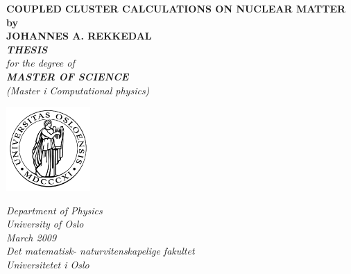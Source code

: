 \thispagestyle{empty}
\begin{center}        %
  \vspace{5mm}          %
  \LARGE
  \textbf{COUPLED CLUSTER CALCULATIONS ON NUCLEAR MATTER} \\
  \Large
  \vspace{5mm}
  \textbf{by} \\
  \vspace{5mm}
  \large
  \textbf{JOHANNES A. REKKEDAL} \\
  \vspace{20mm} 
  \Large
  {\bf{\textsl{THESIS}}} \\
  \textsl{for the degree of} \\
  \vspace{2mm}
  {\bf{\textsl{MASTER OF SCIENCE}}} \\
  \vspace{5mm}
  {\large \textsl {(Master i Computational physics)}}\\
  \vspace{10mm}
  \centerline{
\includegraphics[width=32mm,height=32mm]{uiologo}}
  \vspace{5mm}
  \index{\footnote{}}%
  \textsl{Department of Physics} \\
  \textsl{University of Oslo} \\
  \vspace{10mm}
  \large
  \textsl{March 2009} \\
  \vspace{5mm}
  \normalsize
  \textsl{Det matematisk- naturvitenskapelige fakultet} \\
  \textsl{Universitetet i Oslo} \\
\end{center}
\thispagestyle{empty}
